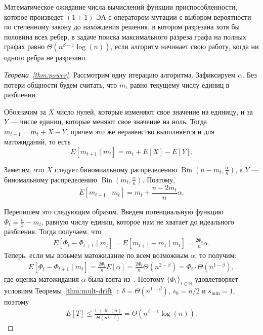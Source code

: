 \documentclass[times]{itmo-student-thesis}
\newcommand{\oea}{\mbox{$(1 + 1)$-ЭА}\xspace}
\newcommand{\N}{{\mathbb N}}
\DeclareMathOperator{\Bin}{Bin}
\begin{document}
\begin{theorem} \label{thm:power}
  Математическое ожидание числа вычислений функции приспособленности, которое произведет \oea с оператором мутации с выбором вероятности по степенному закону до нахождения решения, в котором разрезана хотя бы половина всех ребер, в задаче поиска максимального разреза графа на полных графах равно $\Theta(n^{\beta - 1}\log(n))$, если алгоритм начинает свою работу, когда ни одного ребра не разрезано.
\end{theorem}

\begin{proof}[Теорема~\ref{thm:power}]
Рассмотрим одну итерацию алгоритма. Зафиксируем $\alpha$. Без потери общности будем считать, что $m_t$ равно текущему числу единиц в разбиении.

Обозначим за $X$ число нулей, которые изменяют свое значение на единицу, и за $Y$ --- числе единиц, которые меняют свое значение на ноль. Тогда $m_{t + 1} = m_t + X - Y$, причем это же неравенство выполняется и для матожиданий, то есть
\[
  E[m_{t + 1} \mid m_t] = m_t + E[X] - E[Y].
\]

Заметим, что $X$ следует биномиальному распределению $\Bin(n - m_t, \frac{\alpha}{n})$, а $Y$ --- биномальному распределению $\Bin(m_t, \frac{\alpha}{n})$.
Поэтому,
\[
  E[m_{t + 1} \mid m_t] = m_t + \frac{n - 2m_t}{n} \alpha.
\]

Перепишем это следующим образом. Введем  потенциальную функцию $\Phi_t = \frac{n}{2} - m_t$, равную числу единиц, которое нам не хватает до идеального разбиения. Тогда получаем, что
\begin{align*}
  E[\Phi_t - \Phi_{t + 1} \mid m_t] = E[m_{t + 1} - m_t \mid m_t]  =  \frac{2\Phi_t}{n}\alpha.
\end{align*}
Теперь, если мы возьмем матожидание по всем возможным $\alpha$, то получим:
\begin{align*}
  E[\Phi_t - \Phi_{t + 1} \mid m_t] =  \frac{2\Phi_t}{n}E[\alpha] = \frac{2\Phi_t}{n}\Theta(n^{2 - \beta}) = \Phi_t \cdot \Theta(n^{1 - \beta}),
\end{align*}
где оценка матожидания $\alpha$ была взята из~\cite{Antipov2020}. Поэтому $\{\Phi_t\}_{t \in \N}$ удовлетворяет условиям Теоремы~\ref{thm:mult-drift} c $\delta = \Theta(n^{1 - \beta})$, $s_0 = n/2$ и $s_{\min} = 1$, поэтому
\begin{align*}
  E[T] \le \frac{1 + \ln(n)}{\Theta(n^{1 - \beta})} = \Theta(n^{\beta - 1}\log(n)).
\end{align*} 



\end{proof}
\end{document}
